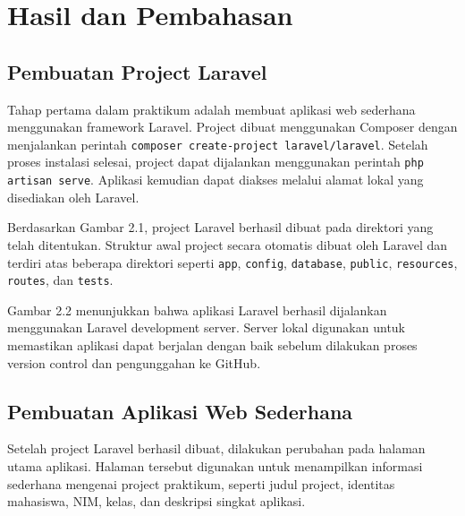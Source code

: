 \chapter{Hasil dan Pembahasan}

\section{Pembuatan Project Laravel}

Tahap pertama dalam praktikum adalah membuat aplikasi web sederhana menggunakan framework Laravel. Project dibuat menggunakan Composer dengan menjalankan perintah \texttt{composer create-project laravel/laravel}. Setelah proses instalasi selesai, project dapat dijalankan menggunakan perintah \texttt{php artisan serve}. Aplikasi kemudian dapat diakses melalui alamat lokal yang disediakan oleh Laravel.


Berdasarkan Gambar 2.1, project Laravel berhasil dibuat pada direktori yang telah ditentukan. Struktur awal project secara otomatis dibuat oleh Laravel dan terdiri atas beberapa direktori seperti \texttt{app}, \texttt{config}, \texttt{database}, \texttt{public}, \texttt{resources}, \texttt{routes}, dan \texttt{tests}.


Gambar 2.2 menunjukkan bahwa aplikasi Laravel berhasil dijalankan menggunakan Laravel development server. Server lokal digunakan untuk memastikan aplikasi dapat berjalan dengan baik sebelum dilakukan proses version control dan pengunggahan ke GitHub.

\section{Pembuatan Aplikasi Web Sederhana}

Setelah project Laravel berhasil dibuat, dilakukan perubahan pada halaman utama aplikasi. Halaman tersebut digunakan untuk menampilkan informasi sederhana mengenai project praktikum, seperti judul project, identitas mahasiswa, NIM, kelas, dan deskripsi singkat aplikasi.


